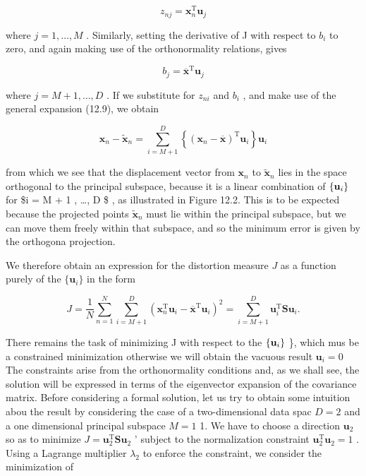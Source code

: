 \documentclass[
  10
]{article}
\begin{document}
\[
z _ {n j} = \mathbf {x} _ {n} ^ {\mathrm{T}} \mathbf {u} _ {j}\tag{12.12}
\]

where \(j = 1 , \dots , M\) . Similarly, setting the derivative of J
with respect to \(b _ { i }\) to zero, and again making use of the
orthonormality relations, gives

\[
b _ {j} = \overline {{\mathbf {x}}} ^ {\mathrm{T}} \mathbf {u} _ {j}\tag{12.13}
\]

where \(j = M { + } 1 , \ldots , D\) . If we substitute for
\(z _ { n i }\) and \(b _ { i }\) , and make use of the general
expansion (12.9), we obtain

\[
\mathbf {x} _ {n} - \widetilde {\mathbf {x}} _ {n} = \sum_ {i = M + 1} ^ {D} \left\{\left(\mathbf {x} _ {n} - \overline {{\mathbf {x}}}\right) ^ {\mathrm{T}} \mathbf {u} _ {i} \right\} \mathbf {u} _ {i}\tag{12.14}
\]

from which we see that the displacement vector from
\(\mathbf { x } _ { n }\) to \(\widetilde { \mathbf { x } } _ { n }\)
lies in the space orthogonal to the principal subspace, because it is a
linear combination of \(\left\{ { \bf { u } } _ { i } \right\}\) for \$i
= M + 1 , \dots , D \$ , as illustrated in Figure 12.2. This is to be
expected because the projected points
\(\widetilde { \mathbf { x } } _ { n }\) must lie within the principal
subspace, but we can move them freely within that subspace, and so the
minimum error is given by the orthogona projection.

We therefore obtain an expression for the distortion measure \(J\) as a
function purely of the \(\{ \mathbf { u } _ { i } \}\) in the form

\[
J = \frac {1}{N} \sum_ {n = 1} ^ {N} \sum_ {i = M + 1} ^ {D} \left(\mathbf {x} _ {n} ^ {\mathrm{T}} \mathbf {u} _ {i} - \overline {{\mathbf {x}}} ^ {\mathrm{T}} \mathbf {u} _ {i}\right) ^ {2} = \sum_ {i = M + 1} ^ {D} \mathbf {u} _ {i} ^ {\mathrm{T}} \mathbf {S u} _ {i}.\tag{12.15}
\]

There remains the task of minimizing J with respect to the
\(\left\{ { \bf { u } } _ { i } \right\}\) \}, which mus be a
constrained minimization otherwise we will obtain the vacuous result
\(\mathbf { u } _ { i } = 0\) The constraints arise from the
orthonormality conditions and, as we shall see, the solution will be
expressed in terms of the eigenvector expansion of the covariance
matrix. Before considering a formal solution, let us try to obtain some
intuition abou the result by considering the case of a two-dimensional
data spac \(D = 2\) and a one dimensional principal subspace \(M = 1\)
1. We have to choose a direction \(\mathbf { u } _ { 2 }\) so as to
minimize
\(J = \mathbf { u } _ { 2 } ^ { \mathrm { T } } \mathbf { S } \mathbf { u } _ { 2 }\)
' subject to the normalization constraint
\(\mathbf { u } _ { 2 } ^ { \mathrm { T } } \mathbf { u } _ { 2 } = 1\)
. Using a Lagrange multiplier \(\lambda _ { 2 }\) to enforce the
constraint, we consider the minimization of
\end{document}
